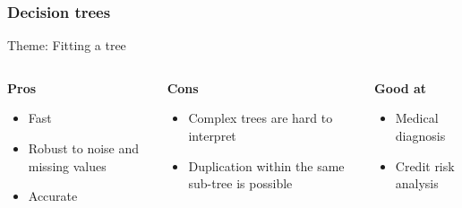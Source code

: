 \begin{frame}\frametitle{Decision trees}
Theme: Fitting a tree

   \begin{columns}[t]
    \begin{column}{0.3\linewidth}
	\textbf{Pros}
		\begin{itemize}
		\item Fast
		\item Robust to noise and missing values
		\item Accurate
		\end{itemize}
    \end{column}
    \begin{column}{0.3\linewidth}
	\textbf{Cons}
			\begin{itemize}
		\item   Complex trees are hard to interpret
		\item Duplication within the same sub-tree is possible
		\end{itemize}
    \end{column}
	
    \begin{column}{0.3\linewidth}
	\textbf{Good at}
			\begin{itemize}
		\item   Medical diagnosis
		\item  Credit risk analysis
		\end{itemize}
    \end{column}
	
  \end{columns}
\end{frame}



